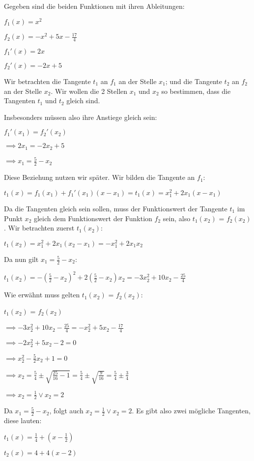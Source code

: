 \item

Gegeben sind die beiden Funktionen mit ihren Ableitungen:

$f_1(x) = x^2$

$f_2(x) = -x^2+5x-\frac{17}{4}$

$f_1'(x) = 2x$

$f_2'(x) = -2x+5$

Wir betrachten die Tangente $t_1$ an $f_1$ an der Stelle $x_1$; und die Tangente $t_2$ an $f_2$ an der Stelle $x_2$. Wir wollen die 2 Stellen $x_1$ und $x_2$ so bestimmen, dass die Tangenten $t_1$ und $t_2$ gleich sind.

Insbesonders müssen also ihre Anstiege gleich sein:

$f_1'(x_1) = f_2'(x_2)$

$\implies 2x_1 = -2x_2+5$

$\implies x_1 = \frac{5}{2}-x_2$

Diese Beziehung nutzen wir später. Wir bilden die Tangente an $f_1$:

$t_1(x) = f_1(x_1) + f_1'(x_1)(x-x_1) = t_1(x) = x_1^2+2x_1(x-x_1)$

Da die Tangenten gleich sein sollen, muss der Funktionswert der Tangente $t_1$ im Punkt $x_2$ gleich dem Funktionswert der Funktion $f_2$ sein, also $t_1(x_2)$ = $f_2(x_2)$. Wir betrachten zuerst $t_1(x_2)$:

$t_1(x_2) = x_1^2+2x_1(x_2-x_1) =-x_1^2+2 x_1 x_2$

Da nun gilt $x_1 = \frac{5}{2}-x_2$:

$t_1(x_2) = -(\frac{5}{2}-x_2)^2+2(\frac{5}{2}-x_2)x_2 =-3x_2^2+10x_2-\frac{25}{4}$

Wie erwähnt muss gelten $t_1(x_2)$ = $f_2(x_2)$:

$t_1(x_2)$ = $f_2(x_2)$

$\implies -3x_2^2+10x_2-\frac{25}{4} = -x_2^2+5x_2-\frac{17}{4}$

$\implies -2x_2^2+5x_2-2 = 0$

$\implies x_2^2-\frac{5}{2}x_2+1 = 0$

$\implies x_2 = \frac{5}{4} \pm \sqrt {\frac{25}{16}-1} = \frac{5}{4} \pm \sqrt {\frac{9}{16}} = \frac{5}{4} \pm \frac{3}{4}$

$\implies x_2 = \frac{1}{2} \lor x_2 = 2$

Da $x_1 = \frac{5}{2}-x_2$, folgt auch $x_2 = \frac{1}{2} \lor x_2 = 2$. Es gibt also zwei mögliche Tangenten, diese lauten:

$t_1(x) = \frac{1}{4} + (x-\frac{1}{2})$

$t_2(x) = 4 + 4(x-2)$

